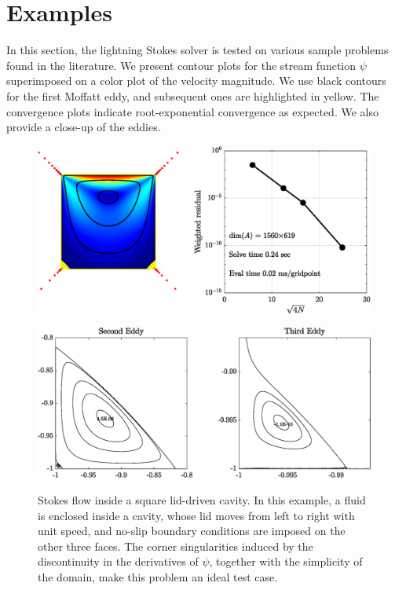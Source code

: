 
\section{Examples \label{sec:results}}
In this section, the lightning Stokes solver is tested on various sample problems found in the literature. We present contour plots for the stream function $\psi$ superimposed on a color plot of the velocity magnitude. We use black contours for the first Moffatt eddy, and subsequent ones are highlighted in yellow. The convergence plots indicate root-exponential convergence as expected. We also provide a close-up of the eddies.

\begin{figure}[H]
	\centering
	\includegraphics[width=\linewidth]{Figures/ldc}
	
	\vspace{2em}
	\includegraphics[width=\linewidth]{Figures/ldc_eddy}
	\label{fig:ldc}
	\caption{Stokes flow inside a square lid-driven cavity. In this example, a fluid is enclosed inside
		a cavity, whose lid moves from left to right with unit speed, and no-slip boundary conditions
		are imposed on the other three faces. The corner singularities induced by the discontinuity in
		the derivatives of $\psi$, together with the simplicity of the domain, make this problem an ideal test
		case.}
\end{figure} 

